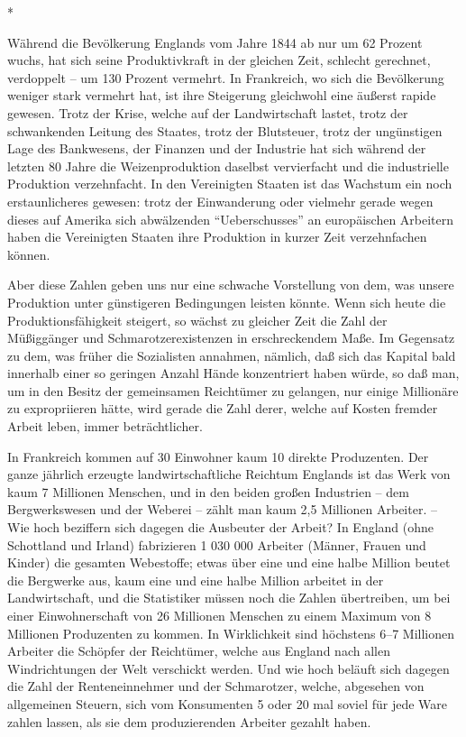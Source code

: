 \documentclass{scrbook}
\begin{document}
\begin{center}*\end{center}

Während die Bevölkerung Englands vom Jahre 1844 ab nur um 62 Prozent wuchs, hat sich seine Produktivkraft in der gleichen Zeit, schlecht gerechnet, verdoppelt – um 130 Prozent vermehrt. In Frankreich, wo sich die Bevölkerung weniger stark vermehrt hat, ist ihre Steigerung gleichwohl eine äußerst rapide gewesen. Trotz der Krise, welche auf der Landwirtschaft lastet, trotz der schwankenden Leitung des Staates, trotz der Blutsteuer, trotz der ungünstigen Lage des Bankwesens, der Finanzen und der Industrie hat sich während der letzten 80 Jahre die Weizenproduktion daselbst vervierfacht und die industrielle Produktion verzehnfacht. In den Vereinigten Staaten ist das Wachstum ein noch erstaunlicheres gewesen: trotz der Einwanderung oder vielmehr gerade wegen dieses auf Amerika sich abwälzenden ``Ueberschusses'' an europäischen Arbeitern haben die Vereinigten Staaten ihre Produktion in kurzer Zeit verzehnfachen können.

Aber diese Zahlen geben uns nur eine schwache Vorstellung von dem, was unsere Produktion unter günstigeren Bedingungen leisten könnte. Wenn sich heute die Produktionsfähigkeit steigert, so wächst zu gleicher Zeit die Zahl der Müßiggänger und Schmarotzerexistenzen in erschreckendem Maße. Im Gegensatz zu dem, was früher die Sozialisten annahmen, nämlich, daß sich das Kapital bald innerhalb einer so geringen Anzahl Hände konzentriert haben würde, so daß man, um in den Besitz der gemeinsamen Reichtümer zu gelangen, nur einige Millionäre zu expropriieren hätte, wird gerade die Zahl derer, welche auf Kosten fremder Arbeit leben, immer beträchtlicher.

In Frankreich kommen auf 30 Einwohner kaum 10 direkte Produzenten. Der ganze jährlich erzeugte landwirtschaftliche Reichtum Englands ist das Werk von kaum 7 Millionen Menschen, und in den beiden großen Industrien – dem Bergwerkswesen und der Weberei – zählt man kaum 2,5 Millionen Arbeiter. – Wie hoch beziffern sich dagegen die Ausbeuter der Arbeit? In England (ohne Schottland und Irland) fabrizieren 1 030 000 Arbeiter (Männer, Frauen und Kinder) die gesamten Webestoffe; etwas über eine und eine halbe Million beutet die Bergwerke aus, kaum eine und eine halbe Million arbeitet in der Landwirtschaft, und die Statistiker müssen noch die Zahlen übertreiben, um bei einer Einwohnerschaft von 26 Millionen Menschen zu einem Maximum von 8 Millionen Produzenten zu kommen. In Wirklichkeit sind höchstens 6–7 Millionen Arbeiter die Schöpfer der Reichtümer, welche aus England nach allen Windrichtungen der Welt verschickt werden. Und wie hoch beläuft sich dagegen die Zahl der Renteneinnehmer und der Schmarotzer, welche, abgesehen von allgemeinen Steuern, sich vom Konsumenten 5 oder 20 mal soviel für jede Ware zahlen lassen, als sie dem produzierenden Arbeiter gezahlt haben.
\end{document}
